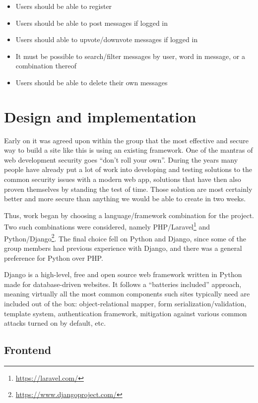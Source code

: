 \documentclass[11pt,english]{article}
\begin{document}
\begin{itemize}
  \item Users should be able to register
  \item Users should be able to post messages if logged in
  \item Users should able to upvote/downvote messages if logged in
  \item It must be possible to search/filter messages by user, word in message, or a combination thereof
  \item Users should be able to delete their own messages
\end{itemize}

\section{Design and implementation}
Early on it was agreed upon within the group that the most effective and secure way to build a site like this is using an existing framework. One of the mantras of web development security goes “don’t roll your own”. During the years many people have already put a lot of work into developing and testing solutions to the common security issues with a modern web app, solutions that have then also proven themselves by standing the test of time. Those solution are most certainly better and more secure than anything we would be able to create in two weeks.

Thus, work began by choosing a language/framework combination for the project. Two such combinations were considered, namely PHP/Laravel\footnote{\url{https://laravel.com/}} and Python/Django\footnote{\url{https://www.djangoproject.com/}}. The final choice fell on Python and Django, since some of the group members had previous experience with Django, and there was a general preference for Python over PHP.

Django is a high-level, free and open source web framework written in Python made for database-driven websites. It follows a “batteries included” approach, meaning virtually all the most common components such sites typically need are included out of the box: object-relational mapper, form serialization/validation, template system, authentication framework, mitigation against various common attacks turned on by default, etc.

\subsection{Frontend}
\end{document}
